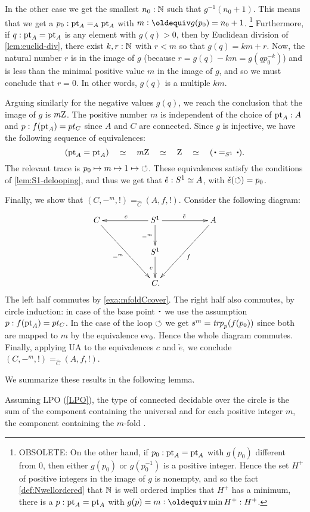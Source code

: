 In the other case we get the smallest $n_0: \mathbb{N}$ such that $g^{-1}(n_0 + 1)$.
This means that we get a $p_0:{\mathord{\mathrm{pt}}}_A=_A{\mathord{\mathrm{pt}}}_A$ with $m\defeq g(p_0)=n_0 +1$. 
\footnote{OBSOLETE: On the other hand, if $p_0:{\mathord{\mathrm{pt}}}_A={\mathord{\mathrm{pt}}}_A$ with $g(p_0)$ different from $0$, then either $g(p_0)$ or $g(p_0^{-1})$ is a positive integer.  Hence the set $H^+$ of positive integers in the image of $g$ is nonempty, and so the fact \cref{def:Nwellordered} that $\mathbb{N}$ is well ordered implies that $H^+$ has a minimum, \ie there is a $p:{\mathord{\mathrm{pt}}}_A={\mathord{\mathrm{pt}}}_A$ with  $g(p)=m\defequi\min H^+:H^+$.}
Furthermore, if $q:{\mathord{\mathrm{pt}}}_A={\mathord{\mathrm{pt}}}_A$ is any element with $g(q)>0$, then  by Euclidean division of \cref{lem:euclid-div}, there exist $k,r:\mathbb{N}$ with $r<m$ so that $g(q)=km+r$.  Now, the natural number $r$ is in the image of $g$ (because $r=g(q)-km=g(qp_0^{-k})$) and is less than the minimal positive value $m$ in the image of $g$, and so we must conclude that $r=0$. In other words, $g(q)$ is a multiple $km$.

Arguing similarly for the negative values $g(q)$, we reach the conclusion that the image of $g$ is $m\mathrm{Z}$.
The positive number $m$ is independent of the choice of ${\mathord{\mathrm{pt}}}_A :A$ and $p: f({\mathord{\mathrm{pt}}}_A)=pt_C$ since
$A$ and $C$ are connected. Since $g$ is injective, we have the following
sequence of equivalences:
\[
(\pt_A=\pt_A)\quad \equiv \quad m\zet \quad\equiv\quad \zet\quad \equiv\quad (\base=_{\Sc}\base).
\]
The relevant trace is $p_0 \mapsto m \mapsto 1 \mapsto {\circlearrowleft}$.
These equivalences satisfy the conditions of \cref{lem:S1-delooping},
and thus we get that $\check e: {S^1}\simeq A$, with $\check e(\circlearrowleft) = p_0$.

Finally, we show that $(C,-^m,!) =_{\hat C} (A,f,!)$.
Consider the following diagram:
\[
\xymatrix{
C\ar[ddrr]_{-^m} && 
\ar[d]_{-^m}\ar[ll]_c\Sc\ar[rr]^{\check e} &&
A\ar[ddll]^{f}\\
&&\Sc\ar[d]_c\\
&&\,C.&}
\]
The left half commutes by \cref{exa:mfoldCcover}.
The right half also commutes, by circle induction:
in case of the base point $\base$ we use the assumption $p: f({\mathord{\mathrm{pt}}}_A)=pt_C$.
In the case of the loop $\circlearrowleft$ we get $s^m = \mathop{\mathit{trp}_{p}}(f(p_0))$ since both
are mapped to $m$ by the equivalence $\mathrm{ev}_0$. Hence the whole diagram
commutes. Finally, applying UA to the equivalences $c$ and $\check e$,
we conclude $(C,-^m,!) =_{\hat C} (A,f,!)$.

We summarize these results in the following lemma.

\begin{lemma}
  \label{lem:componentsofcoversofS1}
Assuming LPO (\cref{LPO}), the type of connected decidable \coverings over the circle is the sum
of the component containing the universal \covering and for each positive integer $m$, 
the component containing the $m$-fold \covering.
\end{lemma}


